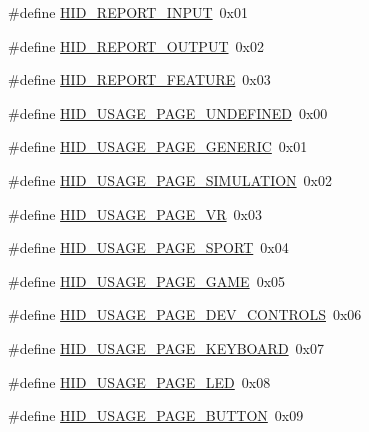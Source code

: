 \begin{DoxyCompactItemize}
\item 
\#define \hyperlink{group__USBD__HID_gae73239f50524749753c8b6e1f11253b9}{H\-I\-D\-\_\-\-R\-E\-P\-O\-R\-T\-\_\-\-I\-N\-P\-U\-T}~0x01
\item 
\#define \hyperlink{group__USBD__HID_ga63548c31cddad143e8eb163be04357cd}{H\-I\-D\-\_\-\-R\-E\-P\-O\-R\-T\-\_\-\-O\-U\-T\-P\-U\-T}~0x02
\item 
\#define \hyperlink{group__USBD__HID_ga0914abbc0a279f78b37d567c54f4888e}{H\-I\-D\-\_\-\-R\-E\-P\-O\-R\-T\-\_\-\-F\-E\-A\-T\-U\-R\-E}~0x03
\end{DoxyCompactItemize}
\begin{DoxyCompactItemize}
\item 
\#define \hyperlink{group__USBD__HID_ga73a32173a51a8d1e21dd14de726593d7}{H\-I\-D\-\_\-\-U\-S\-A\-G\-E\-\_\-\-P\-A\-G\-E\-\_\-\-U\-N\-D\-E\-F\-I\-N\-E\-D}~0x00
\item 
\#define \hyperlink{group__USBD__HID_ga9c343007cfc4f4836b8a8aec4fded7ee}{H\-I\-D\-\_\-\-U\-S\-A\-G\-E\-\_\-\-P\-A\-G\-E\-\_\-\-G\-E\-N\-E\-R\-I\-C}~0x01
\item 
\#define \hyperlink{group__USBD__HID_ga2cdc484710c424ebeb438f72f2a2e942}{H\-I\-D\-\_\-\-U\-S\-A\-G\-E\-\_\-\-P\-A\-G\-E\-\_\-\-S\-I\-M\-U\-L\-A\-T\-I\-O\-N}~0x02
\item 
\#define \hyperlink{group__USBD__HID_ga746db0254ad632c95b768ee09d8c148d}{H\-I\-D\-\_\-\-U\-S\-A\-G\-E\-\_\-\-P\-A\-G\-E\-\_\-\-V\-R}~0x03
\item 
\#define \hyperlink{group__USBD__HID_ga09fcd4f26f12737654445e388ea5c9ff}{H\-I\-D\-\_\-\-U\-S\-A\-G\-E\-\_\-\-P\-A\-G\-E\-\_\-\-S\-P\-O\-R\-T}~0x04
\item 
\#define \hyperlink{group__USBD__HID_ga953e215830449d6bc0718279a9ec914c}{H\-I\-D\-\_\-\-U\-S\-A\-G\-E\-\_\-\-P\-A\-G\-E\-\_\-\-G\-A\-M\-E}~0x05
\item 
\#define \hyperlink{group__USBD__HID_ga41932b4f7dcc0cacd501c6b399bd8332}{H\-I\-D\-\_\-\-U\-S\-A\-G\-E\-\_\-\-P\-A\-G\-E\-\_\-\-D\-E\-V\-\_\-\-C\-O\-N\-T\-R\-O\-L\-S}~0x06
\item 
\#define \hyperlink{group__USBD__HID_ga9c5606a57164a07d982b30bdfc31a90a}{H\-I\-D\-\_\-\-U\-S\-A\-G\-E\-\_\-\-P\-A\-G\-E\-\_\-\-K\-E\-Y\-B\-O\-A\-R\-D}~0x07
\item 
\#define \hyperlink{group__USBD__HID_ga4680a92b7f18a236eacc6f07c51befad}{H\-I\-D\-\_\-\-U\-S\-A\-G\-E\-\_\-\-P\-A\-G\-E\-\_\-\-L\-E\-D}~0x08
\item 
\#define \hyperlink{group__USBD__HID_ga303a1c3920ca7b22c4d1af750897b808}{H\-I\-D\-\_\-\-U\-S\-A\-G\-E\-\_\-\-P\-A\-G\-E\-\_\-\-B\-U\-T\-T\-O\-N}~0x09

\end{DoxyCompactItemize}
